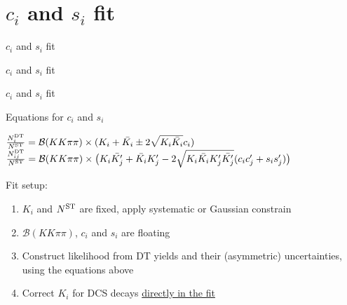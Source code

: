 \documentclass{beamer}
\begin{document}
\section{\texorpdfstring{$c_i$ and $s_i$}{ci and si} fit}
\begin{frame}{$c_i$ and $s_i$ fit}
  \begin{center}
    {\huge $c_i$ and $s_i$ fit}
  \end{center}
\end{frame}

\begin{frame}{$c_i$ and $s_i$ fit}
  \begin{block}{\centering Equations for $c_i$ and $s_i$}
    \begin{center}
      $\frac{N^{\rm DT}_i}{N^{\rm ST}} = \mathcal{B}(KK\pi\pi)\times(K_i + \bar{K_i} \pm 2\sqrt{K_i\bar{K_i}}c_i)$ \\
      $\frac{N^{\rm DT}_{ij}}{N^{\rm ST}} = \mathcal{B}(KK\pi\pi)\times\big(K_i\bar{K_j'} + \bar{K_i}K_j' - 2\sqrt{K_i\bar{K_i}K_j'\bar{K_j'}}(c_ic_j' + s_is_j')\big)$
    \end{center}
  \end{block}
  \begin{center}
    Fit setup:
  \end{center}
  \begin{enumerate}
    \setlength\itemsep{1.0em}
    \item{$K_i$ and $N^{\rm ST}$ are fixed, apply systematic or Gaussian constrain}
    \item{$\mathcal{B}(KK\pi\pi)$, $c_i$ and $s_i$ are floating}
    \item{Construct likelihood from DT yields and their (asymmetric) uncertainties, using the equations above}
    \item{Correct $K_i$ for DCS decays \underline{directly in the fit}}
  \end{enumerate}
\end{frame}
\end{document}

